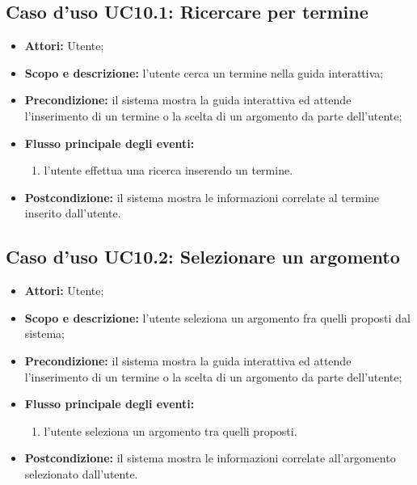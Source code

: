 \subsection{Caso d'uso UC10.1: Ricercare per termine}
\begin{itemize}
\item \textbf{Attori:} Utente;
\item \textbf{Scopo e descrizione:} l'utente cerca un termine nella guida interattiva;
\item \textbf{Precondizione:} il sistema mostra la guida interattiva ed attende l'inserimento di un termine o la scelta di un argomento da parte dell'utente;
\item \textbf{Flusso principale degli eventi:}
\begin{enumerate}
\item l'utente effettua una ricerca inserendo un termine.
\end{enumerate}
\item \textbf{Postcondizione:} il sistema mostra le informazioni correlate al termine inserito dall'utente.
\end{itemize}

\subsection{Caso d'uso UC10.2: Selezionare un argomento}
\begin{itemize}
\item \textbf{Attori:} Utente;
\item \textbf{Scopo e descrizione:} l'utente seleziona un argomento fra quelli proposti dal sistema;
\item \textbf{Precondizione:} il sistema mostra la guida interattiva ed attende l'inserimento di un termine o la scelta di un argomento da parte dell'utente;
\item \textbf{Flusso principale degli eventi:}
\begin{enumerate}
\item l'utente seleziona un argomento tra quelli proposti.
\end{enumerate}
\item \textbf{Postcondizione:} il sistema mostra le informazioni correlate all'argomento selezionato dall'utente.
\end{itemize}

